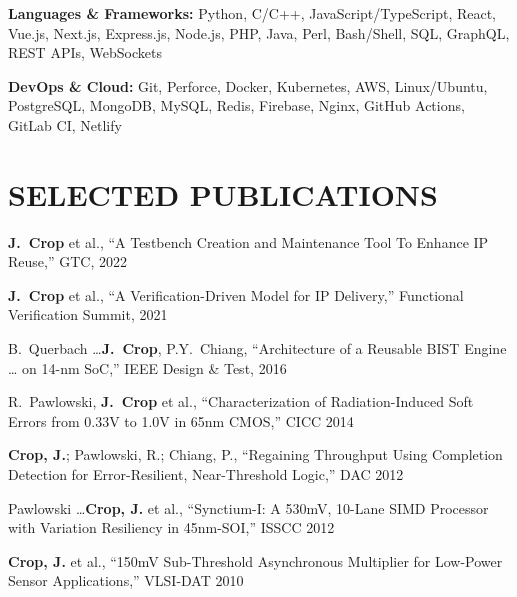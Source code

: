 \documentclass[line,margin]{res}
\begin{document}
\begin{resume}
\textbf{Languages \& Frameworks:} Python, C/C++, JavaScript/TypeScript, React, Vue.js, Next.js,
  Express.js, Node.js, PHP, Java, Perl, Bash/Shell, SQL, GraphQL, REST APIs, WebSockets

\textbf{DevOps \& Cloud:} Git, Perforce, Docker, Kubernetes, AWS, Linux/Ubuntu,
  PostgreSQL, MongoDB, MySQL, Redis, Firebase, Nginx, GitHub Actions, GitLab CI, Netlify


\section{SELECTED PUBLICATIONS}

\textbf{J.~Crop} et al., ``A Testbench Creation and Maintenance Tool To Enhance IP Reuse,'' GTC, 2022

\textbf{J.~Crop} et al., ``A Verification-Driven Model for IP Delivery,'' Functional Verification Summit, 2021

B.~Querbach \ldots \textbf{J.~Crop}, P.Y.~Chiang, ``Architecture of a Reusable BIST Engine \ldots
on 14-nm SoC,'' IEEE Design \& Test, 2016

R.~Pawlowski, \textbf{J.~Crop} et al., ``Characterization of Radiation-Induced Soft Errors from
0.33V to 1.0V in 65nm CMOS,'' CICC 2014

\textbf{Crop, J.}; Pawlowski, R.; Chiang, P., ``Regaining Throughput Using Completion Detection
for Error-Resilient, Near-Threshold Logic,'' DAC 2012

Pawlowski \ldots \textbf{Crop, J.} et al., ``Synctium-I: A 530mV, 10-Lane SIMD Processor with
Variation Resiliency in 45nm-SOI,'' ISSCC 2012

\textbf{Crop, J.} et al., ``150mV Sub-Threshold Asynchronous Multiplier for Low-Power Sensor
Applications,'' VLSI-DAT 2010

\end{resume}
\end{document}
